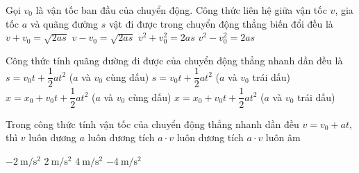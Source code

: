 \begin{ex}
	Gọi $v_0$ là vận tốc ban đầu của chuyển động. Công thức liên hệ giữa vận tốc $v$, gia tốc $a$ và quãng đường $s$ vật đi được trong chuyển động thẳng biến đổi đều là
	\choice
	{$v+v_0=\sqrt{2as}$}
	{$v-v_0=\sqrt{2as}$}
	{$v^2+v^2_0=2as$}
	{\True $v^2-v^2_0=2as$}
	\loigiai{}
\end{ex}

\begin{ex}
	Công thức tính quãng đường đi được của chuyển động thẳng nhanh dần đều là
	\choice
	{\True $s=v_0t+\dfrac{1}{2}at^2$ ($a$ và $v_0$ cùng dấu)}
	{$s=v_0t+\dfrac{1}{2}at^2$ ($a$ và $v_0$ trái dấu)}
	{$x=x_0+v_0t+\dfrac{1}{2}at^2$ ($a$ và $v_0$ cùng dấu)}
	{$x=x_0+v_0t+\dfrac{1}{2}at^2$ ($a$ và $v_0$ trái dấu)}
	\loigiai{}
\end{ex}

\begin{ex}
	Trong công thức tính vận tốc của chuyển động thẳng nhanh dần đều $v = v_0 + at$, thì
	\choice
	{$v$ luôn dương}
	{$a$ luôn dương}
	{\True tích $a\cdot v$ luôn dương}
	{tích $a\cdot v$ luôn âm}
	\loigiai{}
\end{ex}



\begin{ex}
	\choice
	{\True $\SI{-2}{\meter/\second^2}$}
	{$\SI{2}{\meter/\second^2}$}
	{$\SI{4}{\meter/\second^2}$}
	{$\SI{-4}{\meter/\second^2}$}
\end{ex}


